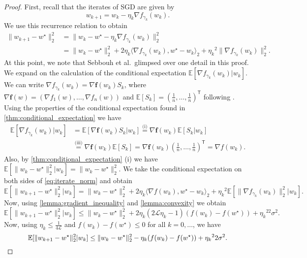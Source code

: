 \documentclass[12pt]{article}
\theoremstyle{definition}
\numberwithin{equation}{section}
\newcommand{\E}{\mathbb{E}}
\newcommand{\CL}{\mathcal{L}}
\newcommand{\T}{\mathsf{T}}
\newcommand{\ev}[1]{\mathbb{E}\left[{#1}\right]}
\newcommand{\norm}[1]{\lVert{#1}\rVert_2}
\newcommand{\scp}[2]{\langle{#1}, {#2}\rangle_2}
\begin{document}
\begin{proof}
  First, recall that the iterates of SGD are given by
  \begin{equation*}
    w_{k+1} = w_{k} - \eta_k \nabla f_{\gamma_k}(w_{k}).
  \end{equation*}
  We use this recurrence relation to obtain
  \begin{equation}
    \label{eq:iterate_norm}
    \begin{split}
      \norm{w_{k+1} - w^\star}^2 &= \norm{w_{k} - w^\star - \eta_k \nabla f_{\gamma_k}(w_{k})}^2 \\
    &= \norm{w_{k} - w^\star}^2 + 2 \eta_k \scp{\nabla f_{\gamma_k}(w_{k})}{ w^\star - w_{k}} + {\eta_k}^2\norm{\nabla f_{\gamma_k}(w_{k})}^2.
    \end{split}
  \end{equation}
  At this point, we note that Sebbouh et al.\ glimpsed over one detail in this proof. We expand on the calculation of the conditional expectation $\ev{\nabla f_{\gamma_k}(w_k)| w_k}$.
  We can write $\nabla f_{\gamma_k}(w_k) = \nabla \mathbf{f}(w_k)S_k$, where $\nabla \mathbf{f}(w) = \left(\nabla f_1(w), \dots, \nabla f_n(w)\right)$ and $\ev{S_k} = \left(\frac{1}{n}, \dots, \frac{1}{n}\right)^\T$ following \cite{wuNoisyGradientDescent2020a}. Using the properties of the conditional expectation found in \autoref{thm:conditional_expectation} we have
  \begin{align*}
    \ev{\nabla f_{\gamma_k}(w_k)|w_k} &= \ev{\nabla \mathbf{f}(w_k)S_k|w_k} \stackrel{\text{(i)}}{=} \nabla \mathbf{f}(w_k) \ev{S_k|w_k} \\
    &\stackrel{\text{(iii)}}{=} \nabla \mathbf{f}(w_k) \ev{S_k} = \nabla \mathbf{f}(w_k) \left(\frac{1}{n}, \dots, \frac{1}{n}\right)^\T = \nabla f(w_k).
  \end{align*}
  Also, by \autoref{thm:conditional_expectation} (i) we have $\ev{\norm{w_{k} - w^\star}^2|w_k} = \norm{w_{k} - w^\star}^2$.
  We take the conditional expectation on both sides of \eqref{eq:iterate_norm} and obtain
  \begin{equation*}
    \E[\norm{w_{k+1} - w^\star}^2|w_k] = \norm{w_{k} - w^\star}^2 + 2 \eta_k \scp{\nabla f(w_{k})}{w^\star - w_{k}}+ {\eta_k}^2\E[\norm{\nabla f_{\gamma_k}(w_{k})}^2|w_k].
  \end{equation*}
  Now, using \autoref{lemma:gradient_inequality} and \autoref{lemma:convexity} we obtain
  \begin{equation*}
    \E[\norm{w_{k+1} - w^\star}^2|w_k] \leq \norm{w_{k} - w^\star}^2 + 2 \eta_k(2\CL \eta_k - 1)(f(w_{k}) - f(w^\star))+ {\eta_k}^22\sigma^2.
  \end{equation*}
  Now, using $\eta_k \leq \frac{1}{4 \CL}$ and $f(w_k) - f(w^\star) \leq 0$ for all $k=0,\dots$, we have
  \begin{equation*}
    \E[\norm{w_{k+1} - w^\star}^2|w_k] \leq \norm{w_{k} - w^\star}^2 - \eta_k(f(w_{k}) - f(w^\star))+ {\eta_k}^22\sigma^2. \qedhere
  \end{equation*}
\end{proof}
\end{document}
